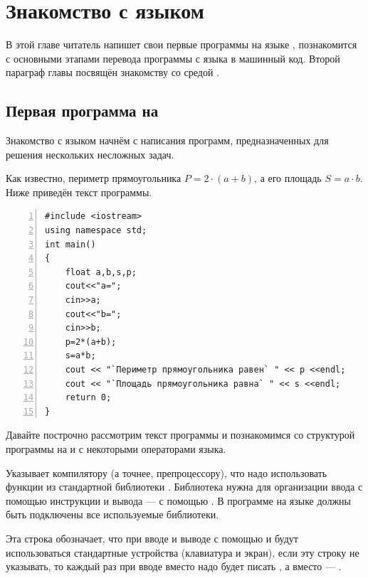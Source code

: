 \chapter[Знакомство с языком \Sys{С++}]{Знакомство с языком }

В этой главе читатель напишет свои первые программы на языке , 
познакомится с основными этапами перевода программы
с языка  в машинный код. Второй параграф главы посвящён 
знакомству со средой .

\section[Первая программа на \Sys{C++}]{Первая программа на }
Знакомство с языком  начнём с написания программ, предназначенных 
для решения нескольких несложных задач.


Как известно, периметр прямоугольника $P=2\cdot(a+b)$, а его площадь 
$S=a\cdot{b}$. 
Ниже приведён текст программы. 

\begin{lstlisting}[numbers=left, numberstyle=\tiny, stepnumber=1, numbersep=5pt]
#include <iostream> 
using namespace std; 
int main() 
{ 
    float a,b,s,p; 
    cout<<"a="; 
    cin>>a; 
    cout<<"b="; 
    cin>>b; 
    p=2*(a+b); 
    s=a*b; 
    cout << "`Периметр прямоугольника равен` " << p <<endl; 
    cout << "`Площадь прямоугольника равна` " << s <<endl; 
    return 0; 
}
\end{lstlisting}

Давайте построчно рассмотрим текст программы и познакомимся 
со структурой программы на  и с некоторыми операторами
языка. 

 Указывает компилятору (а точнее, препроцессору), что надо использовать функции из стандартной
библиотеки . Библиотека  нужна для организации ввода с
помощью инструкции  и вывода --- с помощью . В программе на языке  должны
быть подключены все используемые библиотеки.

 Эта строка обозначает, что при вводе и выводе с помощью  и
 будут использоваться стандартные устройства (клавиатура и экран), если эту строку не указывать,
то каждый раз при вводе вместо  надо будет писать , а вместо
 --- .

